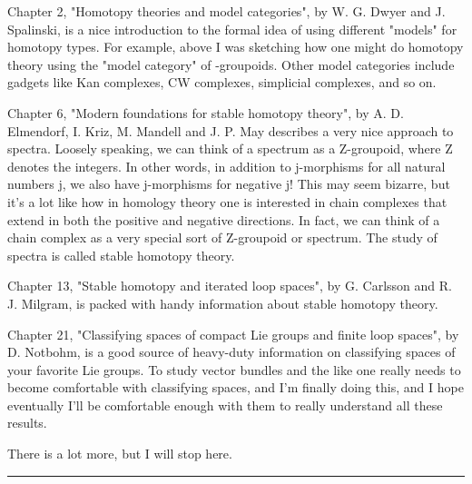 Chapter 2, "Homotopy theories and model categories", by W. G. Dwyer
and J. Spalinski, is a nice introduction to the formal idea of using
different "models" for homotopy types.  For example, above I was
sketching how one might do homotopy theory using the "model category"
of \omega -groupoids.  Other model categories include gadgets like Kan
complexes, CW complexes, simplicial complexes, and so on.  

Chapter 6, "Modern foundations for stable homotopy theory", by
A. D. Elmendorf, I. Kriz, M. Mandell and J. P. May describes a very
nice approach to spectra.  Loosely speaking, we can think of a
spectrum as a Z-groupoid, where Z denotes the integers.  In other
words, in addition to j-morphisms for all natural numbers j, we also
have j-morphisms for negative j!  This may seem bizarre, but it's a
lot like how in homology theory one is interested in chain complexes
that extend in both the positive and negative directions.  In fact,
we can think of a chain complex as a very special sort of Z-groupoid
or spectrum.  The study of spectra is called stable homotopy theory.

Chapter 13, "Stable homotopy and iterated loop spaces", by G. Carlsson
and R. J. Milgram, is packed with handy information about stable
homotopy theory.

Chapter 21, "Classifying spaces of compact Lie groups and finite loop
spaces", by D. Notbohm, is a good source of heavy-duty information on
classifying spaces of your favorite Lie groups.  To study vector
bundles and the like one really needs to become comfortable with
classifying spaces, and I'm finally doing this, and I hope eventually
I'll be comfortable enough with them to really understand all these
results.

There is a lot more, but I will stop here.

\par\noindent\rule{\textwidth}{0.4pt}

